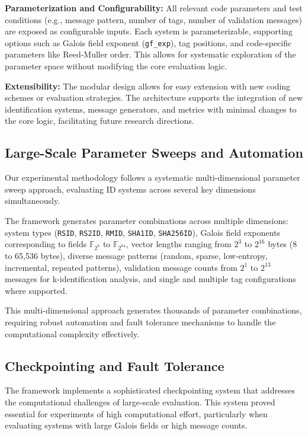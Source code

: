 \documentclass[english,BCOR=4mm,cdfont=false]{tudscrreprt} %
\begin{document}
\textbf{Parameterization and Configurability:} All relevant code parameters and test conditions (e.g., message pattern, number of tags, number of validation messages) are exposed as configurable inputs. Each system is parameterizable, supporting options such as Galois field exponent (\texttt{gf\_exp}), tag positions, and code-specific parameters like Reed-Muller order. This allows for systematic exploration of the parameter space without modifying the core evaluation logic.

\textbf{Extensibility:} The modular design allows for easy extension with new coding schemes or evaluation strategies. The architecture supports the integration of new identification systems, message generators, and metrics with minimal changes to the core logic, facilitating future research directions.

\subsection{Large-Scale Parameter Sweeps and Automation}
Our experimental methodology follows a systematic multi-dimensional parameter sweep approach, evaluating ID systems across several key dimensions simultaneously.

The framework generates parameter combinations across multiple dimensions: system types (\texttt{RSID}, \texttt{RS2ID}, \texttt{RMID}, \texttt{SHA1ID}, \texttt{SHA256ID}), Galois field exponents corresponding to fields $\mathbb{F}_{2^8}$ to $\mathbb{F}_{2^{64}}$, vector lengths ranging from $2^3$ to $2^{16}$ bytes (8 to 65,536 bytes), diverse message patterns (random, sparse, low-entropy, incremental, repeated patterns), validation message counts from $2^1$ to $2^{13}$ messages for k-identification analysis, and single and multiple tag configurations where supported.

This multi-dimensional approach generates thousands of parameter combinations, requiring robust automation and fault tolerance mechanisms to handle the computational complexity effectively.

\subsection{Checkpointing and Fault Tolerance}
The framework implements a sophisticated checkpointing system that addresses the computational challenges of large-scale evaluation. This system proved essential for experiments of high computational effort, particularly when evaluating systems with large Galois fields or high message counts.
\end{document}
